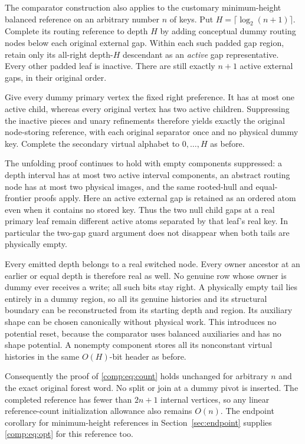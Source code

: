 \documentclass[11pt]{article}
\numberwithin{equation}{section}
\begin{document}
The comparator construction also applies to the customary minimum-height
balanced reference on an arbitrary number $n$ of keys. Put
$H=\lceil\log_2(n+1)\rceil$. Complete its routing reference to depth
$H$ by adding conceptual dummy routing nodes below each original
external gap. Within each such padded gap region, retain only its
all-right depth-$H$ descendant as an \emph{active} gap representative.
Every other padded leaf is inactive. There are still exactly $n+1$
active external gaps, in their original order.

Give every dummy primary vertex the fixed right preference. It has
at most one active child, whereas every original vertex has two active
children. Suppressing the inactive pieces and unary refinements
therefore yields exactly the original node-storing reference, with
each original separator once and no physical dummy key. Complete the
secondary virtual alphabet to $0,\ldots,H$ as before.

The unfolding proof continues to hold with empty components suppressed:
a depth interval has at most two active interval components, an
abstract routing node has at most two physical images, and the same
rooted-hull and equal-frontier proofs apply. Here an active external
gap is retained as an ordered atom even when it contains no stored
key. Thus the two null child gaps at a real primary leaf remain
different active atoms separated by that leaf's real key. In
particular the two-gap guard argument does not disappear when both
tails are physically empty.

Every emitted depth belongs to a real switched node. Every owner
ancestor at an earlier or equal depth is therefore real as well.
No genuine row whose owner is dummy ever receives a write; all such
bits stay right. A physically empty tail lies entirely in a dummy
region, so all its genuine histories and its structural boundary can
be reconstructed from its starting depth and region. Its auxiliary
shape can be chosen canonically without physical work. This introduces
no potential reset, because the comparator uses balanced auxiliaries
and has no shape potential. A nonempty component stores all its
nonconstant virtual histories in the same $O(H)$-bit header as before.

Consequently the proof of \eqref{comp:eq:count} holds unchanged for arbitrary $n$ and
the exact original forest word. No split or join at a dummy pivot is
inserted. The completed reference has fewer than $2n+1$ internal
vertices, so any linear reference-count initialization allowance also
remains $O(n)$. The endpoint corollary for minimum-height references in
Section~\ref{sec:endpoint} supplies \eqref{comp:eq:opt} for this reference too.
\end{document}
